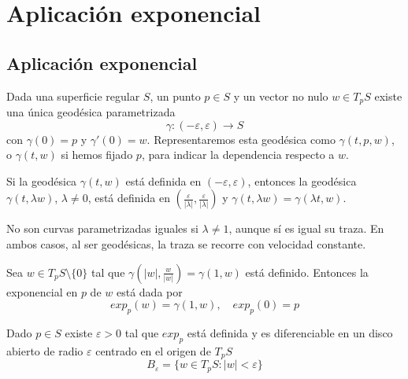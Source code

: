 \chapter{Aplicación exponencial}

\section{Aplicación exponencial}

\begin{definition}
    Dada una superficie regular $S$, un punto $p \in S$ y un vector no nulo $w \in T_pS$ existe una única geodésica parametrizada
    $$\gamma : (-\varepsilon, \varepsilon) \to S$$
    con $\gamma(0) = p$ y $\gamma'(0) = w$.
    Representaremos esta geodésica como $\gamma(t,p,w)$, o $\gamma(t,w)$ si hemos fijado $p$, para indicar la dependencia respecto a $w$.
\end{definition}

\begin{lemma}
    Si la geodésica $\gamma(t,w)$ está definida en $(-\varepsilon, \varepsilon)$, entonces la geodésica $\gamma(t, \lambda w)$, $\lambda \neq 0$, está definida en $(\frac{\varepsilon}{|\lambda|}, \frac{\varepsilon}{|\lambda|})$ y $\gamma(t, \lambda w) = \gamma(\lambda t, w)$.
\end{lemma}

\begin{remark}
    No son curvas parametrizadas iguales si $\lambda \neq 1$, aunque sí es igual su traza.
    En ambos casos, al ser geodésicas, la traza se recorre con velocidad constante.
\end{remark}

\begin{definition}
    Sea $w \in T_pS \setminus \{0\}$ tal que $\gamma(|w|, \frac{w}{|w|}) = \gamma(1, w)$ está definido.
    Entonces la exponencial en $p$ de $w$ está dada por
    $$exp_p(w) = \gamma(1, w), \quad exp_p(0) = p$$
\end{definition}

\begin{proposition}
    Dado $p \in S$ existe $\varepsilon>0$ tal que $exp_p$ está definida y es diferenciable en un disco abierto de radio $\varepsilon$ centrado en el origen de $T_pS$
    $$B_\varepsilon = \{ w \in T_pS : |w| < \varepsilon \}$$
\end{proposition}

